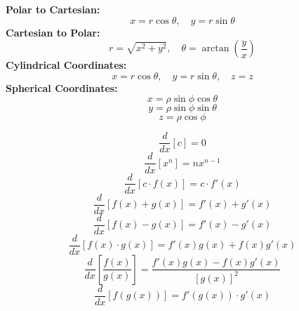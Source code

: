 \documentclass[2pt]{article}
\begin{document}
\begin{multicols}{2}
\begin{tcolorbox}[title=\textbf{Common Coordinate Transformations}, colframe=lightgreen]
    \textbf{Polar to Cartesian:}
    \[ x = r \cos \theta, \quad y = r \sin \theta \]
    \textbf{Cartesian to Polar:}
    \[ r = \sqrt{x^2 + y^2}, \quad \theta = \arctan \left( \frac{y}{x} \right) \]
    \textbf{Cylindrical Coordinates:}
    \[ x = r \cos \theta, \quad y = r \sin \theta, \quad z = z \]
    \textbf{Spherical Coordinates:}
    \[ x = \rho \sin \phi \cos \theta \]
    \[ y = \rho \sin \phi \sin \theta \]
    \[ z = \rho \cos \phi \]
\end{tcolorbox}

\begin{tcolorbox}[title=\textbf{Derivative Rules}, colframe=lightblue]
    \[ \frac{d}{dx} [c] = 0 \]
    \[ \frac{d}{dx} [x^n] = nx^{n-1} \]
    \[ \frac{d}{dx} [c \cdot f(x)] = c \cdot f'(x) \]
    \[ \frac{d}{dx} [f(x) + g(x)] = f'(x) + g'(x) \]
    \[ \frac{d}{dx} [f(x) - g(x)] = f'(x) - g'(x) \]
    \[ \frac{d}{dx} [f(x) \cdot g(x)] = f'(x) g(x) + f(x) g'(x) \]
    \[ \frac{d}{dx} \left[ \frac{f(x)}{g(x)} \right] = \frac{f'(x) g(x) - f(x) g'(x)}{[g(x)]^2} \]
    \[ \frac{d}{dx} [f(g(x))] = f'(g(x)) \cdot g'(x) \]
\end{tcolorbox}

\end{multicols}
\end{document}
